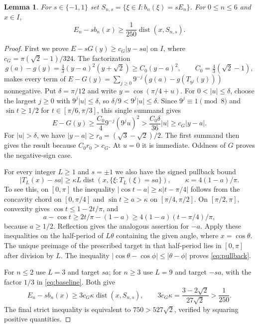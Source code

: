 \documentclass[11pt]{article}
\newtheorem{lemma}{Lemma}
\newcommand{\dist}{\operatorname{dist}}
\begin{document}
\begin{lemma}\label{lem:gap}
For $s\in\{-1,1\}$ set $S_{n,s}=\{\xi\in I:b_n(\xi)=sE_n\}$.
For $0\le n\le6$ and $x\in I$,
\[
 E_n-sb_n(x)\ge\frac1{250}\dist(x,S_{n,s}).
\]
\end{lemma}
\begin{proof}
First we prove $E-sG(y)\ge c_G|y-sa|$ on $I$, where
$c_G=\pi(\sqrt2-1)/324$. The factorization
\[
 g(a)-g(y)=\tfrac43(y-a)^2(y+\sqrt2)
       \ge C_0(y-a)^2,\qquad C_0=\tfrac43(\sqrt2-1),
\]
makes every term of $E-G(y)=\sum_{j\ge0}9^{-j}(g(a)-g(T_{9^j}(y)))$
nonnegative. Put $\delta=\pi/12$ and write $y=\cos(\pi/4+u)$.
For $0<|u|\le\delta$, choose the largest $j\ge0$ with
$9^j|u|\le\delta$, so $\delta/9<9^j|u|\le\delta$.
Since $9^j\equiv1\pmod8$ and $\sin t\ge1/2$ for
$t\in[\pi/6,\pi/3]$, this single summand gives
\[
 E-G(y)\ge \frac{C_0}{4}9^{-j}(9^ju)^2
     >\frac{C_0\delta}{36}|u|\ge c_G|y-a|.
\]
For $|u|>\delta$, we have $|y-a|\ge r_0=(\sqrt3-\sqrt2)/2$.
The first summand then gives the result because $C_0r_0>c_G$.
At $u=0$ it is immediate. Oddness of $G$ proves the negative-sign case.

For every integer $L\ge1$ and $s=\pm1$ we also have the signed pullback bound
\begin{equation}\label{eq:pullback}
 |T_L(x)-sa|\ge\kappa L\dist(x,\{\xi:T_L(\xi)=sa\}),
 \qquad\kappa=4(1-a)/\pi.
\end{equation}
To see this, on $[0,\pi]$ the inequality
$|\cos t-a|\ge\kappa|t-\pi/4|$ follows from the concavity chord on
$[0,\pi/4]$ and $\sin t\ge a>\kappa$ on $[\pi/4,\pi/2]$.
On $[\pi/2,\pi]$, convexity gives $\cos t\le1-2t/\pi$, and
\[
 a-\cos t\ge 2t/\pi-(1-a)
               \ge 4(1-a)(t-\pi/4)/\pi,
\]
because $a\ge1/2$. Reflection gives the analogous assertion for $-a$.
Apply these inequalities on the half-period of $L\theta$ containing the
given angle, where $x=\cos\theta$. The unique preimage of the prescribed
target in that half-period lies in $[0,\pi]$ after division by $L$.
The inequality $|\cos\theta-\cos\phi|\le|\theta-\phi|$ proves
\eqref{eq:pullback}.

For $n\le2$ use $L=3$ and target $sa$; for $n\ge3$ use $L=9$ and
target $-sa$, with the factor $1/3$ in \eqref{eq:baseline}. Both give
\[
 E_n-sb_n(x)\ge 3c_G\kappa\dist(x,S_{n,s}),\qquad
 3c_G\kappa=\frac{3-2\sqrt2}{27\sqrt2}>\frac1{250}.
\]
The final strict inequality is equivalent to $750>527\sqrt2$, verified by
squaring positive quantities.
\end{proof}
\end{document}

